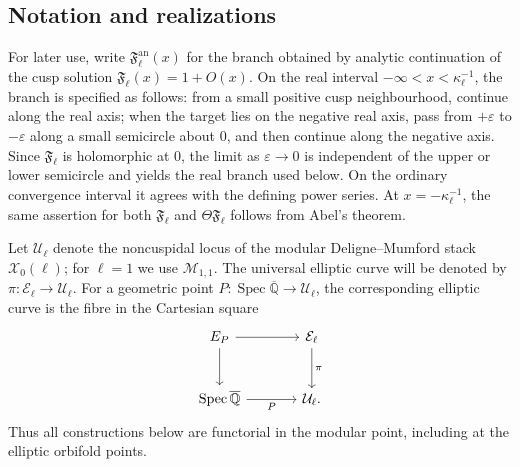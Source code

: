 \documentclass[11pt,a4paper]{amsart} %
\theoremstyle{definition}
\newcommand{\Qbar}{\overline{\mathbb Q}}
\begin{document}
\subsection*{Notation and realizations}

For later use, write \({\mathfrak F}^{\mathrm{an}}_\ell(x)\) for the branch
obtained by analytic continuation of the cusp solution
\({\mathfrak F}_\ell(x)=1+O(x)\). On the real interval
\(-\infty<x<\kappa_\ell^{-1}\), the branch is specified as follows: from a
small positive cusp neighbourhood, continue along the real axis; when the
target lies on the negative real axis, pass from \(+\varepsilon\) to
\(-\varepsilon\) along a small semicircle about \(0\), and then continue
along the negative axis. Since \({\mathfrak F}_\ell\) is holomorphic at
\(0\), the limit as \(\varepsilon\to0\) is independent of the upper or
lower semicircle and yields the real branch used below. On the ordinary
convergence interval it agrees with the defining power series. At
\(x=-\kappa_\ell^{-1}\), the same assertion for both
\({\mathfrak F}_\ell\) and \(\Theta{\mathfrak F}_\ell\) follows from Abel's
theorem.

Let \(\mathcal U_\ell\) denote the noncuspidal locus of the modular
Deligne--Mumford stack \(\mathcal X_0(\ell)\); for \(\ell=1\) we use
\(\mathcal M_{1,1}\). The universal elliptic curve will be denoted by
\(\pi:\mathcal E_\ell\to\mathcal U_\ell\). For a geometric point
\(P:\operatorname{Spec}\Qbar\to\mathcal U_\ell\), the corresponding
elliptic curve is the fibre in the Cartesian square
\[
\begin{tikzcd}[column sep=large,row sep=large]
E_P \arrow[r] \arrow[d] & \mathcal E_\ell \arrow[d,"\pi"]\\
\operatorname{Spec}\Qbar \arrow[r,"P"'] & \mathcal U_\ell .
\end{tikzcd}
\]
Thus all constructions below are functorial in the modular point, including
at the elliptic orbifold points.
\end{document}
